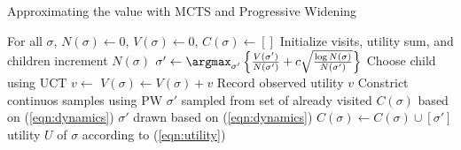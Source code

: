 %

\begin{algorithm}
\caption{Approximating the value with MCTS and Progressive Widening}
\label{algo:mcvts}
  \begin{algorithmic}[1]
    \State For all $\sigma$, $N(\sigma) \gets 0$, $V(\sigma) \gets 0$, $C(\sigma) \gets []$
	\Comment Initialize visits, utility sum, and children
    \State increment $N(\sigma)$
    \State $\sigma' \gets \argmax_{\sigma'} \left\{\frac{V(\sigma')}{N(\sigma')} + c \sqrt{\frac{\log N(\sigma)}{N(\sigma')}} \right\}$
      \Comment Choose child using UCT
	  \State $v \gets $
      \State $V(\sigma) \gets V(\sigma) + v$
	  \Comment Record observed utility
      \State \Return $v$
	  \Comment Constrict continuos samples using PW
        \State $\sigma'$ sampled from set of already visited $C(\sigma)$ based on (\ref{eqn:dynamics})
	  \Else
        \State $\sigma'$ drawn based on (\ref{eqn:dynamics})
        \State $C(\sigma) \gets C(\sigma) \cup [\sigma']$
	  \EndIf
      \State \Return {}
    \State \Return utility $U$ of $\sigma$ according to (\ref{eqn:utility})
    \EndIf
    \EndFunction{}
  \end{algorithmic}
\end{algorithm}

